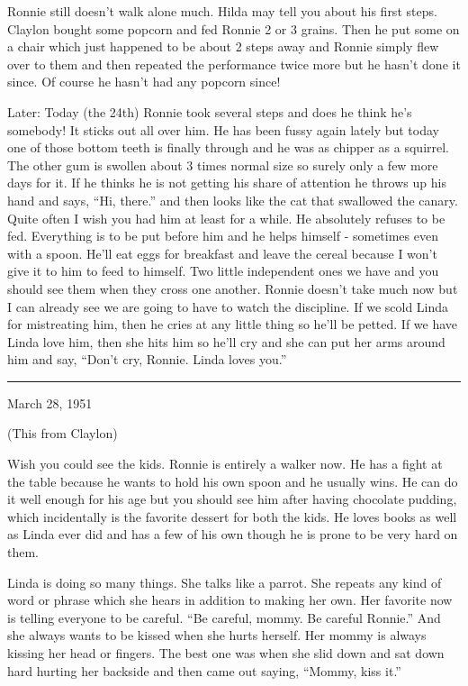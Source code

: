 \documentclass[]{book}
\begin{document}
Ronnie still doesn't walk alone much. Hilda may tell you about his first steps. Claylon bought some popcorn and fed Ronnie 2 or 3 grains. Then he put some on a chair which just happened to be about 2 steps away and Ronnie simply flew over to them and then repeated the performance twice more but he hasn't done it since. Of course he hasn't had any popcorn since!

Later: Today (the 24th) Ronnie took several steps and does he think he's somebody! It sticks out all over him. He has been fussy again lately but today one of those bottom teeth is finally through and he was as chipper as a squirrel. The other gum is swollen about 3 times normal size so surely only a few more days for it. If he thinks he is not getting his share of attention he throws up his hand and says, ``Hi, there.'' and then looks like the cat that swallowed the canary. Quite often I wish you had him at least for a while. He absolutely refuses to be fed. Everything is to be put before him and he helps himself - sometimes even with a spoon. He'll eat eggs for breakfast and leave the cereal because I won't give it to him to feed to himself. Two little independent ones we have and you should see them when they cross one another. Ronnie doesn't take much now but I can already see we are going to have to watch the discipline. If we scold Linda for mistreating him, then he cries at any little thing so he'll be petted. If we have Linda love him, then she hits him so he'll cry and she can put her arms around him and say, ``Don't cry, Ronnie. Linda loves you.''

\begin{center}\rule{0.5\linewidth}{\linethickness}\end{center}

March 28, 1951

(This from Claylon)

Wish you could see the kids. Ronnie is entirely a walker now. He has a fight at the table because he wants to hold his own spoon and he usually wins. He can do it well enough for his age but you should see him after having chocolate pudding, which incidentally is the favorite dessert for both the kids. He loves books as well as Linda ever did and has a few of his own though he is prone to be very hard on them.

Linda is doing so many things. She talks like a parrot. She repeats any kind of word or phrase which she hears in addition to making her own. Her favorite now is telling everyone to be careful. ``Be careful, mommy. Be careful Ronnie.'' And she always wants to be kissed when she hurts herself. Her mommy is always kissing her head or fingers. The best one was when she slid down and sat down hard hurting her backside and then came out saying, ``Mommy, kiss it.''
\end{document}
